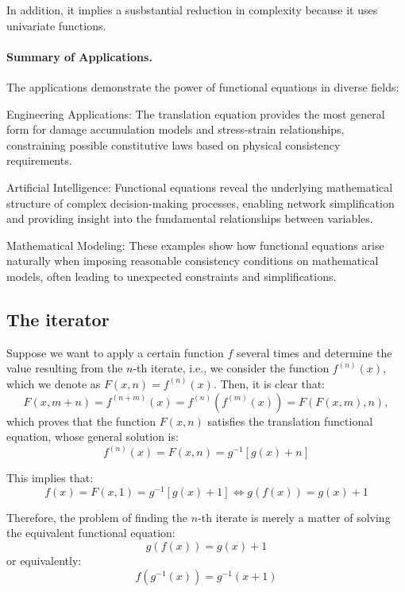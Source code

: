 In addition, it implies a susbstantial reduction in complexity because it uses univariate functions.

\paragraph{Summary of Applications.}
The applications demonstrate the power of functional equations in diverse fields:

Engineering Applications: The translation equation provides the most general form for damage accumulation models and stress-strain relationships, constraining possible constitutive laws based on physical consistency requirements.

Artificial Intelligence: Functional equations reveal the underlying mathematical structure of complex decision-making processes, enabling network simplification and providing insight into the fundamental relationships between variables.

Mathematical Modeling: These examples show how functional equations arise naturally when imposing reasonable consistency conditions on mathematical models, often leading to unexpected constraints and simplifications.

\subsection{The iterator}
Suppose we want to apply a certain function $f$ several times and determine the value resulting from the $n$-th iterate, i.e., we consider the function $f^{(n)}(x)$, which we denote as $F(x,n) = f^{(n)}(x)$. Then, it is clear that:
\begin{equation}
F(x, m+n) = f^{(n+m)}(x) = f^{(n)}(f^{(m)}(x)) = F(F(x,m), n),
\end{equation}
which proves that the function $F(x,n)$ satisfies the translation functional equation, whose general solution is:
\begin{equation}
\label{eq:iterator_general}
f^{(n)}(x) = F(x,n) = g^{-1}[g(x) + n]
\end{equation}

This implies that:
\begin{equation}
\label{eq:single_iteration}
f(x) = F(x,1) = g^{-1}[g(x) + 1] \Leftrightarrow g(f(x)) = g(x) + 1
\end{equation}

Therefore, the problem of finding the $n$-th iterate is merely a matter of solving the equivalent functional equation:
\begin{equation}
\label{eq:abel_equation}
g(f(x)) = g(x) + 1
\end{equation}
or equivalently:
\begin{equation}
f(g^{-1}(x)) = g^{-1}(x + 1)
\end{equation}

